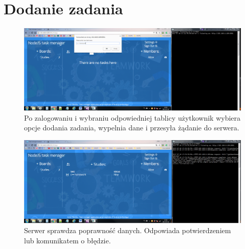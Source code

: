 \documentclass[12pt]{report}
\begin{document}
\section{Dodanie zadania}
\begin{figure}[!hb]
\centering
\includegraphics[width=\textwidth,height=\textheight,keepaspectratio]{A1.png}
\captionsetup{labelformat=empty}
\caption[]{Po zalogowaniu i wybraniu odpowiedniej tablicy użytkownik wybiera opcje dodania zadania, wypelnia dane i przesyła żądanie do serwera.}
\end{figure}
\begin{figure}[!hb]
\centering
\includegraphics[width=\textwidth,height=\textheight,keepaspectratio]{A2.png}
\captionsetup{labelformat=empty}
\caption[]{Serwer sprawdza poprawność danych. Odpowiada potwierdzeniem lub komunikatem o błędzie.}
\end{figure}
\end{document}

